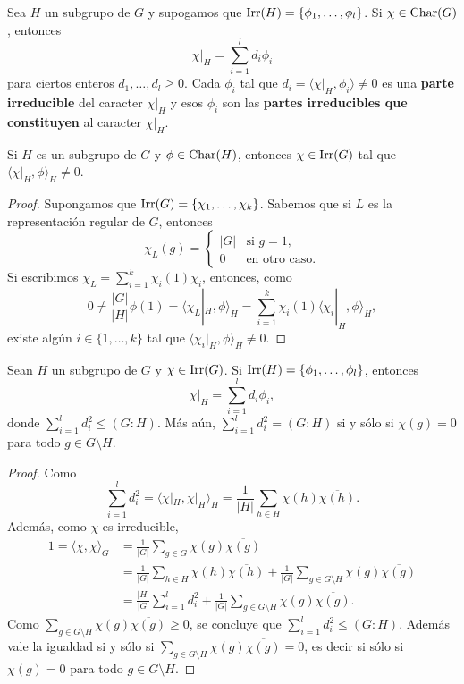 Sea $H$ un subgrupo de $G$ y supogamos que $\operatorname{Irr}(H)=\{\phi_1,\dots,\phi_l\}$.
Si $\chi\in\operatorname{Char}(G)$, entonces
\[
\chi|_H=\sum_{i=1}^ld_i\phi_i
\]
para ciertos enteros $d_1,\dots,d_l\geq 0$. 
Cada $\phi_i$ tal que $d_i=\langle\chi|_H,\phi_i\rangle\ne 0$ 
es una \textbf{parte irreducible} del caracter $\chi|_H$ y esos
$\phi_i$ son las \textbf{partes irreducibles que constituyen} al caracter $\chi|_H$. 

\begin{proposition}
    Si $H$ es un subgrupo de $G$ y $\phi\in\operatorname{Char}(H)$, 
    entonces $\chi\in\operatorname{Irr}(G)$ tal que $\langle\chi|_H,\phi\rangle_H\ne 0$.
\end{proposition}

\begin{proof}
    Supongamos que $\operatorname{Irr}(G)=\{\chi_1,\dots,\chi_k\}$. 
    Sabemos que si $L$ es la representación regular de $G$, entonces
    \[
    \chi_L(g)=\begin{cases}
    |G| & \text{si $g=1$},\\
    0 & \text{en otro caso}.
    \end{cases}
    \]
    Si escribimos $\chi_L=\sum_{i=1}^k\chi_i(1)\chi_i$, entonces, como
    \[
    0\ne \frac{|G|}{|H|}\phi(1)=\langle \chi_L|_H,\phi\rangle_H=\sum_{i=1}^k\chi_i(1)\langle\chi_i|_H,\phi\rangle_H,
    \]
    existe algún $i\in\{1,\dots,k\}$ 
    tal que $\langle\chi_i|_H,\phi\rangle_H\ne 0$. 
\end{proof}

\begin{proposition}
    Sean $H$ un subgrupo de $G$ y $\chi\in\operatorname{Irr}(G)$. Si $\operatorname{Irr}(H)=\{\phi_1,\dots,\phi_l\}$, entonces
    \[
    \chi|_H=\sum_{i=1}^ld_i\phi_i,
    \]
    donde $\sum_{i=1}^l d_i^2\leq (G:H)$. Más aún, $\sum_{i=1}^l d_i^2=(G:H)$ 
    si y sólo si $\chi(g)=0$ para todo $g\in G\setminus H$. 
\end{proposition}

\begin{proof}
Como 
\[
\sum_{i=1}^ld_i^2=\langle\chi|_H,\chi|_H\rangle_H=\frac{1}{|H|}\sum_{h\in H}\chi(h)\overline{\chi(h)}.
\]
Además, como $\chi$ es irreducible, 
\begin{align*}
1=\langle\chi,\chi\rangle_G&=\frac{1}{|G|}\sum_{g\in G}\chi(g)\overline{\chi(g)}\\
&=\frac{1}{|G|}\sum_{h\in H}\chi(h)\overline{\chi(h)}
+\frac{1}{|G|}\sum_{g\in G\setminus H}\chi(g)\overline{\chi(g)}\\
&=\frac{|H|}{|G|}\sum_{i=1}^l d_i^2+\frac{1}{|G|}\sum_{g\in G\setminus H}\chi(g)\overline{\chi(g)}.
\end{align*}
Como $\sum_{g\in G\setminus H}\chi(g)\overline{\chi(g)}\geq0$, se concluye que $\sum_{i=1}^ld_i^2\leq(G:H)$. Además
vale la igualdad si y sólo si $\sum_{g\in G\setminus H}\chi(g)\overline{\chi(g)}=0$, 
es decir si sólo si $\chi(g)=0$ para todo $g\in G\setminus H$.
\end{proof}

